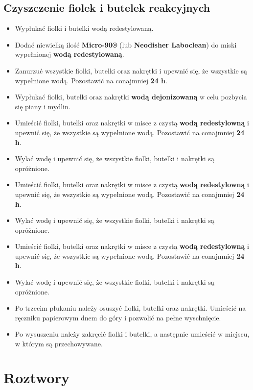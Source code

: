 \documentclass[
  letterpaper,
  DIV=11,
  numbers=noendperiod]{scrreprt}
\providecommand{\tightlist}{%
  \setlength{\itemsep}{0pt}\setlength{\parskip}{0pt}}\usepackage{longtable,booktabs,array}
\begin{document}
\hypertarget{czyszczenie-fiolek-i-butelek-reakcyjnych}{%
\section{Czyszczenie fiolek i butelek
reakcyjnych}\label{czyszczenie-fiolek-i-butelek-reakcyjnych}}

\begin{itemize}
\tightlist
\item
  Wypłukać fiolki i butelki wodą redestylowaną.
\item
  Dodać niewielką ilość \textbf{Micro-90®} (lub \textbf{Neodisher
  Laboclean}) do miski wypełnionej \textbf{wodą redestylowaną}.
\item
  Zanurzuć wszystkie fiolki, butelki oraz nakrętki i upewnić się, że
  wszystkie są wypełnione wodą. Pozostawić na conajmniej \textbf{24 h}.
\item
  Wypłukać fiolki, butelki oraz nakrętki \textbf{wodą dejonizowaną} w
  celu pozbycia się piany i mydlin.
\item
  Umieścić fiolki, butelki oraz nakrętki w misce z czystą \textbf{wodą
  redestylowną} i upewnić się, że wszystkie są wypełnione wodą.
  Pozostawić na conajmniej \textbf{24 h}.
\item
  Wylać wodę i upewnić się, że wszystkie fiolki, butelki i nakrętki są
  opróżnione.
\item
  Umieścić fiolki, butelki oraz nakrętki w misce z czystą \textbf{wodą
  redestylowną} i upewnić się, że wszystkie są wypełnione wodą.
  Pozostawić na conajmniej \textbf{24 h}.
\item
  Wylać wodę i upewnić się, że wszystkie fiolki, butelki i nakrętki są
  opróżnione.
\item
  Umieścić fiolki, butelki oraz nakrętki w misce z czystą \textbf{wodą
  redestylowną} i upewnić się, że wszystkie są wypełnione wodą.
  Pozostawić na conajmniej \textbf{24 h}.
\item
  Wylać wodę i upewnić się, że wszystkie fiolki, butelki i nakrętki są
  opróżnione.
\item
  Po trzecim płukaniu należy osuszyć fiolki, butelki oraz nakrętki.
  Umieścić na ręczniku papierowym dnem do góry i pozwolić na pełne
  wyschnięcie.
\item
  Po wysuszeniu należy zakręcić fiolki i butelki, a następnie umieścić w
  miejscu, w którym są przechowywane.
\end{itemize}

\hypertarget{roztwory}{%
\chapter{Roztwory}\label{roztwory}}
\end{document}
